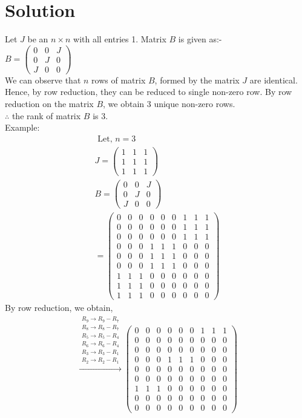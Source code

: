 \documentclass[journal,12pt,twocolumn]{IEEEtran}
\numberwithin{equation}{subsection}
\newcommand{\myvec}[1]{\ensuremath{\begin{pmatrix}#1\end{pmatrix}}}
\begin{document}
\section{Solution}
Let $J$ be an $ n \times n$ with all entries 1. Matrix $B$ is given as:-\\
$B = \begin{pmatrix}0&0&J\\0&J&0\\J&0&0\end{pmatrix}$\\
We can observe that $n$ rows of matrix $B$, formed by the matrix $J$ are identical. Hence, by row reduction, they can be reduced to single non-zero  row.  By row reduction on the matrix $B$, we obtain 3 unique non-zero rows. \\
$\therefore$ the rank of matrix $B$ is 3.\\
Example: 
\begin{align}
\text{ Let, } n =3\\
J = \myvec{1&1&1\\1&1&1\\1&1&1}\\
B=\myvec{0&0&J\\0&J&0\\J&0&0}\\
=\myvec{0&0&0&0&0&0&1&1&1\\0&0&0&0&0&0&1&1&1\\0&0&0&0&0&0&1&1&1\\0&0&0&1&1&1&0&0&0\\0&0&0&1&1&1&0&0&0\\0&0&0&1&1&1&0&0&0\\1&1&1&0&0&0&0&0&0\\1&1&1&0&0&0&0&0&0\\1&1&1&0&0&0&0&0&0}
\end{align}
By row reduction, we obtain,
\begin{align}
 \xrightarrow{\substack{R_9\rightarrow R_9 - R_7\\R_8\rightarrow R_8-R_7\\R_5\rightarrow R_5 - R_4\\R_6\rightarrow R_6-R_4\\R_3\rightarrow R_3 - R_1\\R_2\rightarrow R_2-R_1}} \myvec{0&0&0&0&0&0&1&1&1\\0&0&0&0&0&0&0&0&0\\0&0&0&0&0&0&0&0&0\\0&0&0&1&1&1&0&0&0\\0&0&0&0&0&0&0&0&0\\0&0&0&0&0&0&0&0&0\\1&1&1&0&0&0&0&0&0\\0&0&0&0&0&0&0&0&0\\0&0&0&0&0&0&0&0&0}
 \end{align}
\end{document}
